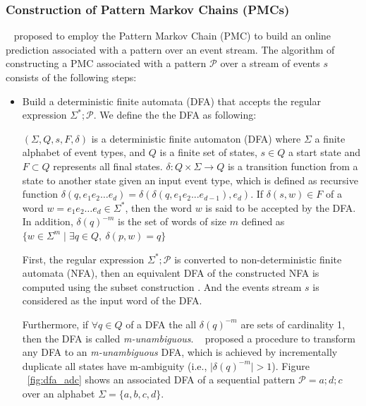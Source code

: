 \subsubsection*{Construction of Pattern Markov Chains (PMCs)}

~\citet{alevizos2017event} proposed to employ the Pattern Markov Chain (PMC) \cite{nuel_pattern_2008} to build an online prediction associated with a pattern over an event stream. The algorithm of constructing a PMC associated with a pattern $\mathcal{P}$ over a stream of events $s$ consists of the following steps:

\begin{itemize}[noitemsep]
	\item Build a deterministic finite automata (DFA) that accepts the regular expression $\Sigma^{*};\mathcal{P}$. We define the the DFA as following:
	
	\begin{definition}
	 $(\Sigma,Q,s,F,\delta)$ is a deterministic finite automaton (DFA)  where  $\Sigma$ a finite alphabet of event types, and $Q$ is a finite set of states, $s \in Q$ a start state and $F \subset Q$ represents all final states. $\delta: Q \times \Sigma \rightarrow Q$ is a transition function from a state to another state given an input event type, which is defined as recursive function $\delta(q,e_{1}e_{2}\ldots e_{d})=\delta(\delta(q,e_{1}e_{2}...e_{d-1}),e_{d})$. If $\delta(s,w) \in F$ of a word $w=e_{1}e_{2}\ldots e_{d} \in \Sigma^{*}$, then the word $w$ is said to be accepted by the DFA. In addition,  $\delta(q)^{-m}$ is the set of words of size $m$ defined as $\{w \in \Sigma^{m} \mid \exists q \in Q,\ \delta(p,w)=q \}$
\end{definition}
	
	First, the regular expression $\Sigma^{*};\mathcal{P}$ is converted to non-deterministic finite automata (NFA), then an equivalent DFA of the constructed NFA is computed using the subset construction \cite{hopcroft2006automata,alevizos2017event}. And the events stream $s$ is considered as the input word of the DFA. 

Furthermore, if $\forall q \in Q$ of a DFA the all $\delta(q)^{-m}$ are sets of cardinality 1, then the DFA is called \textit{m-unambiguous}. ~\citet{nuel_pattern_2008} proposed a procedure to transform any DFA to an \textit{m-unambiguous} DFA, which is achieved by incrementally duplicate all states have m-ambiguity (i.e., $\vert\delta(q)^{-m}\vert > 1$).   Figure ~\ref{fig:dfa_adc} shows an associated DFA of a sequential pattern $\mathcal{P}=a ; d ; c$ over an alphabet $\Sigma=\{a,b,c,d\}$. 



\end{itemize}
